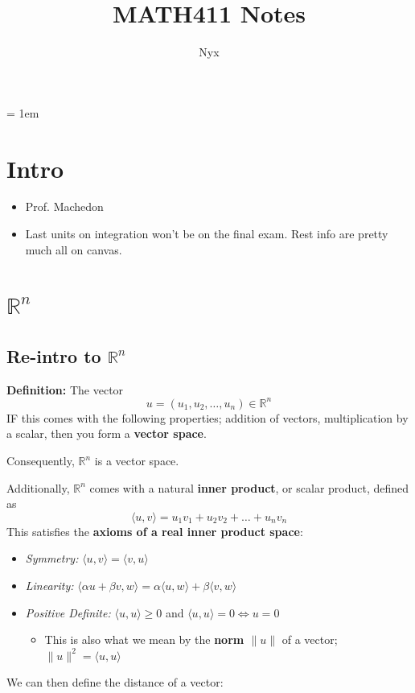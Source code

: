 \documentclass{article}
\title{MATH411 Notes}
\newcommand*{\iprod}[1]{\langle #1 \rangle}
\newcommand*{\rr}{\mathbb{R}}%
\begin{document}
\author{Nyx}
\maketitle

\parskip = 1em
\pgfplotsset{compat=1.17}
\setcounter{section}{-1}

\section{Intro}
\begin{itemize}
    \item Prof. Machedon
    \item Last units on integration won't be on the final exam. Rest info are pretty much all on canvas.
\end{itemize}

\section{$\rr^n$}
\subsection{Re-intro to $\rr^n$}
\textbf{Definition:} The vector \[
    \mathit{u}=(u_1, u_2, \ldots, u_n) \in \rr^n
\]
IF this comes with the following properties; addition of vectors, multiplication by a scalar, then you form a \textbf{vector space}.

Consequently, $\rr^n$ is a vector space.

Additionally, $\rr^n$ comes with a natural \textbf{inner product}, or scalar product, defined as \[
   \iprod{u,v} = u_1v_1 + u_2v_2 + \ldots + u_nv_n
\]
This satisfies the \textbf{axioms of a real inner product space}:
\begin{itemize}
    \item \textit{Symmetry:} $\iprod{u,v} = \iprod{v,u}$
    \item \textit{Linearity:} $\iprod{\alpha u + \beta v, w} = \alpha \iprod{u,w} + \beta \iprod{v,w}$
    \item \textit{Positive Definite:} $\iprod{u,u} \geq 0$ and $\iprod{u,u} = 0 \iff u = 0$
    \begin{itemize}
        \item This is also what we mean by the \textbf{norm $\|u\|$} of a vector; $\|u\|^2 = \iprod{u,u}$
    \end{itemize}
\end{itemize}

We can then define the distance of a vector:
\end{document}
